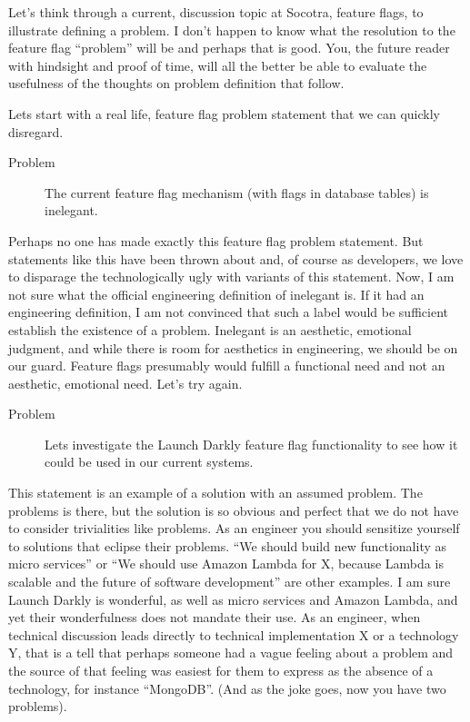Let's think through a current, discussion topic at Socotra, feature flags, to illustrate defining a problem. I don't happen to know what the
resolution to the feature flag ``problem'' will be and perhaps that is good. You, the future reader with hindsight and proof of time, will
all the better be able to evaluate the usefulness of the thoughts on problem definition that follow.

Lets start with a real life, feature flag problem statement that we can quickly disregard.
\begin{description}
\item[Problem] The current feature flag
mechanism (with flags in database tables) is inelegant.
\end{description}
Perhaps no one has made exactly this feature flag problem statement. But statements like this have been thrown about and, of course as
developers, we love to disparage the technologically ugly with variants of this statement. Now, I am not sure what the official engineering
definition of inelegant is. If it had an engineering definition, I am not convinced that such a label would be sufficient establish the
existence of a problem. Inelegant is an aesthetic, emotional judgment, and while there is room for aesthetics in engineering, we should be
on our guard. Feature flags presumably would fulfill a functional need and not an aesthetic, emotional need. Let's try again.

\begin{description}
\item[Problem] Lets investigate the Launch Darkly feature flag functionality to see how it could be used in our current systems.
\end{description}
This statement is an example of a solution with an assumed problem. The problems is there, but the solution is so obvious and perfect that
we do not have to consider trivialities like problems. As an engineer you should sensitize yourself to solutions that eclipse their problems.
``We should build new functionality as micro services'' or
``We should use Amazon Lambda for X, because Lambda is scalable and the future of software development'' are other examples. I am sure Launch Darkly is wonderful,
as well as micro services and Amazon Lambda, and yet their wonderfulness does not mandate their use. As an engineer, when technical discussion 
leads directly to technical implementation X or a technology Y, that is a tell that perhaps someone had a vague feeling about a
problem and the source of that feeling was easiest for them to express as the absence of a technology, for instance ``MongoDB''. (And as the joke goes, now
you have two problems).

